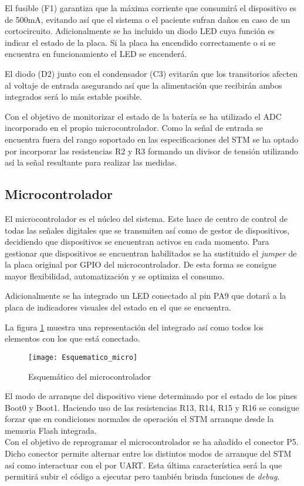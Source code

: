 El fusible (F1) garantiza que la máxima corriente que consumirá el dispositivo es de 500mA, evitando así que el sistema o el paciente sufran daños en caso de un cortocircuito. Adicionalmente se ha incluido un diodo \acrshort{LED} cuya función es indicar el estado de la placa. Si la placa ha encendido correctamente o si se encuentra en funcionamiento el \acrshort{LED} se encenderá.

El diodo (D2) junto con el condensador (C3) evitarán que los transitorios afecten al voltaje de entrada asegurando así que la alimentación que recibirán ambos integrados será lo más estable posible.

Con el objetivo de monitorizar el estado de la batería se ha utilizado el \acrshort{ADC} incorporado en el propio microcontrolador. Como la señal de entrada se encuentra fuera del rango soportado en las especificaciones del STM se ha optado por incorporar las resistencias R2 y R3 formando un divisor de tensión utilizando así la señal resultante para realizar las medidas.

\clearpage

\subsection{Microcontrolador\label{sec:Esquemáticos_micro}}

El microcontrolador es el núcleo del sistema. Este hace de centro de control de todas las señales digitales que se transmiten así como de gestor de dispositivos, decidiendo que dispositivos se encuentran activos en cada momento. 
Para gestionar que dispositivos se encuentran habilitados se ha sustituido el \textit{jumper} de la placa original por \acrshort{GPIO} del microcontrolador. De esta forma se consigue mayor flexibilidad, automatización y se optimiza el consumo. 

Adicionalmente se ha integrado un \acrshort{LED} conectado al pin PA9 que dotará a la placa de indicadores visuales del estado en el que se encuentra.

La figura \ref{fig:Esquematico_micro} muestra una representación del integrado así como todos los elementos con los que está conectado.

\begin{figure} [h]
    \centering
    \texttt{[image: Esquematico\_micro]}
    \caption{Esquemático del microcontrolador}
    \label{fig:Esquematico_micro}
\end{figure}

El modo de arranque del dispositivo viene determinado por el estado de los pines Boot0 y Boot1. Haciendo uso de las resistencias R13, R14, R15 y R16 se consigue forzar que en condiciones normales de operación el STM arranque desde la memoria Flash integrada. 
\\Con el objetivo de reprogramar el microcontrolador se ha añadido el conector P5. Dicho conector permite alternar entre los distintos modos de arranque del STM así como interactuar con el por UART. Esta última característica será la que permitirá subir el código a ejecutar pero también brinda funciones de \textit{debug}.


